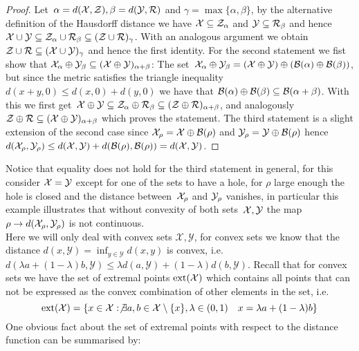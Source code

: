 %
\begin{proof}
Let~$\alpha=d(\mathcal X,\mathcal Z),\beta=d(\mathcal Y,\mathcal R)$ and $\gamma=\max\{\alpha,\beta\}$, by the alternative definition of the Hausdorff distance we have $\mathcal X\subseteq\mathcal Z_\alpha$ and $\mathcal Y\subseteq\mathcal R_\beta$ and hence $\mathcal X\cup\mathcal Y\subseteq\mathcal Z_\alpha\cup\mathcal R_\beta\subseteq(\mathcal Z\cup\mathcal R)_\gamma$. 
%
With an analogous argument we obtain $\mathcal Z\cup\mathcal R\subseteq(\mathcal X\cup\mathcal Y)_\gamma$ and hence the first identity.
%
For the second statement we fist show that $\mathcal X_\alpha\oplus\mathcal Y_\beta\subseteq(\mathcal X\oplus\mathcal Y)_{\alpha+\beta}$:
%
The set~$\mathcal X_\alpha\oplus\mathcal Y_\beta = (\mathcal X\oplus\mathcal Y)\oplus(\mathcal B(\alpha)\oplus\mathcal B(\beta))$, but since the metric satisfies the triangle inequality~$d(x+y,0)\leq d(x,0)+d(y,0)$ we have that $\mathcal B(\alpha)\oplus\mathcal B(\beta)\subseteq\mathcal B(\alpha+\beta)$.
%
With this we first get~$\mathcal X\oplus\mathcal Y\subseteq\mathcal Z_\alpha\oplus\mathcal R_\beta\subseteq(\mathcal Z\oplus\mathcal R)_{\alpha+\beta}$, and analogously~$\mathcal Z\oplus\mathcal R\subseteq(\mathcal X\oplus\mathcal Y)_{\alpha+\beta}$ which proves the statement.
%
The third statement is a slight extension of the second case since $\mathcal X_\rho=\mathcal X\oplus\mathcal B(\rho)$ and $\mathcal Y_\rho = \mathcal Y\oplus\mathcal B(\rho)$ hence $d(\mathcal X_\rho,\mathcal Y_\rho)\leq d(\mathcal X,\mathcal Y)+d(\mathcal B(\rho),\mathcal B(\rho))=d(\mathcal X,\mathcal Y)$.
\end{proof}
%
\noindent Notice that equality does not hold for the third statement in general, for this consider $\mathcal X=\mathcal Y$ except for one of the sets to have a hole, for $\rho$ large enough the hole is closed and the distance between~$\mathcal X_\rho$ and $\mathcal Y_\rho$ vanishes, in particular this example illustrates that without convexity of both sets~$\mathcal X,\mathcal Y$ the map $\rho\rightarrow d(\mathcal X_\rho,\mathcal Y_\rho)$ is not continuous.
%
\\[1em]
%
\noindent\mysplit Here we will only deal with convex sets $\mathcal X,\mathcal Y$, for convex sets we know that the distance $d(x,\mathcal Y) = \inf_{y\in\mathcal Y}d(x,y)$ is convex, i.e. $d(\lambda a + (1-\lambda)b,\mathcal Y)\leq\lambda d(a,\mathcal Y)+(1-\lambda) d(b,\mathcal Y)$.
%
Recall that for convex sets we have the set of extremal points $\text{ext}(\mathcal X)$ which contains all points that can not be expressed as the convex combination of other elements in the set, i.e.
%
\begin{equation}
	\text{ext}(\mathcal X) = \{x\in\mathcal X: \not\exists a,b\in\mathcal X\setminus\{x\} ,\lambda\in(0,1)\quad x=\lambda a + (1-\lambda) b \}
\end{equation}
%
One obvious fact about the set of extremal points with respect to the distance function can be summarised by:
